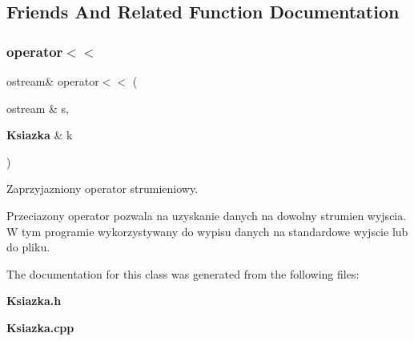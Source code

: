 \subsection{Friends And Related Function Documentation}
\mbox{\label{class_ksiazka_a6304f50ce62c067a686efe441f71c54d}} 
\subsubsection{operator$<$$<$}
{\footnotesize\ttfamily ostream\& operator$<$$<$ (\begin{DoxyParamCaption}\item[{ostream \&}]{s,  }\item[{\textbf{ Ksiazka} \&}]{k }\end{DoxyParamCaption})\hspace{0.3cm}{\ttfamily [friend]}}



Zaprzyjazniony operator strumieniowy. 

Przeciazony operator pozwala na uzyskanie danych na dowolny strumien wyjscia. W tym programie wykorzystywany do wypisu danych na standardowe wyjscie lub do pliku. 

The documentation for this class was generated from the following files\+:\begin{DoxyCompactItemize}
\item 
\textbf{ Ksiazka.\+h}\item 
\textbf{ Ksiazka.\+cpp}\end{DoxyCompactItemize}
